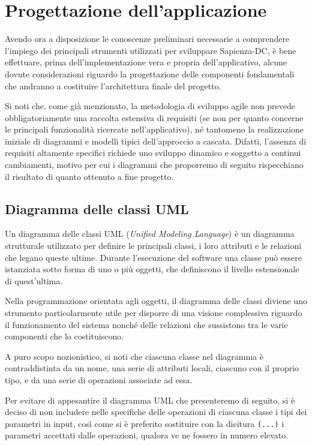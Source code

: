 \chapter{Progettazione dell'applicazione}
Avendo ora a disposizione le conoscenze preliminari necessarie a comprendere l'impiego dei principali strumenti utilizzati per sviluppare Sapienza-DC, è bene effettuare, prima dell'implementazione vera e propria dell'applicativo, alcune dovute considerazioni riguardo la progettazione delle componenti fondamentali che andranno a costituire l'architettura finale del progetto.

Si noti che, come già menzionato, la metodologia di sviluppo agile non prevede obbligatoriamente una raccolta estensiva di requisiti (se non per quanto concerne le principali funzionalità ricercate nell'applicativo), né tantomeno la realizzazione iniziale di diagrammi e modelli tipici dell'approccio a cascata. Difatti, l'assenza di requisiti altamente specifici richiede uno sviluppo dinamico e soggetto a continui cambiamenti, motivo per cui i diagrammi che proporremo di seguito rispecchiano il risultato di quanto ottenuto a fine progetto.   

\section{Diagramma delle classi UML}
Un diagramma delle classi UML (\textit{Unified Modeling Language}) è un diagramma strutturale utilizzato per definire le principali classi, i loro attributi e le relazioni che legano queste ultime. Durante l'esecuzione del software una classe può essere istanziata sotto forma di uno o più oggetti, che definiscono il livello estensionale di quest'ultima. 

Nella programmazione orientata agli oggetti, il diagramma delle classi diviene uno strumento particolarmente utile per disporre di una visione complessiva riguardo il funzionamento del sistema nonché delle relazioni che sussistono tra le varie componenti che lo costituiscono.

A puro scopo nozionistico, si noti che ciascuna classe nel diagramma è contraddistinta da un nome, una serie di attributi locali, ciascuno con il proprio tipo, e da una serie di operazioni associate ad essa.

Per evitare di appesantire il diagramma UML che presenteremo di seguito, si è deciso di non includere nelle specifiche delle operazioni di ciascuna classe i tipi dei parametri in input, così come si è preferito sostituire con la dicitura \texttt{(...)} i parametri accettati dalle operazioni, qualora ve ne fossero in numero elevato.

